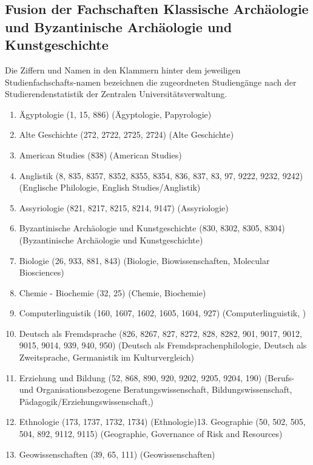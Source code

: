 \subsection{Fusion der Fachschaften Klassische Archäologie und Byzantinische Archäologie und Kunstgeschichte}
    \label{sec:appendix2}
    Die  Ziffern  und  Namen  in  den  Klammern  hinter  dem  jeweiligen  Studienfachschafts-namen bezeichnen die zugeordneten Studiengänge nach der Studierendenstatistik der Zentralen Universitätsverwaltung.
    \begin{enumerate}[noitemsep]
        \item Ägyptologie (1, 15, 886) (Ägyptologie, Papyrologie) 
        \item Alte Geschichte (272, 2722, 2725, 2724) (Alte Geschichte) 
        \item American Studies (838) (American Studies) 
        \item Anglistik (8, 835, 8357, 8352, 8355, 8354, 836, 837, 83, 97, 9222, 9232, 9242) (Englische Philologie, English Studies/Anglistik)
        \item Assyriologie (821, 8217, 8215, 8214, 9147) (Assyriologie) 
        \item Byzantinische Archäologie und Kunstgeschichte (830, 8302, 8305, 8304) (Byzantinische Archäologie und Kunstgeschichte) 
        \item Biologie (26, 933, 881, 843) (Biologie, Biowissenschaften, Molecular Biosciences) 
        \item Chemie - Biochemie (32, 25) (Chemie, Biochemie)
        \item Computerlinguistik (160, 1607, 1602, 1605, 1604, 927) (Computerlinguistik, ) 
        \item Deutsch als Fremdsprache (826, 8267, 827, 8272, 828, 8282, 901, 9017, 9012, 9015, 9014, 939, 940, 950) (Deutsch als Fremdsprachenphilologie, Deutsch als Zweitsprache, Germanistik im Kulturvergleich) 
        \item Erziehung und Bildung (52, 868, 890, 920, 9202, 9205, 9204, 190) (Berufs- und Organisationsbezogene Beratungswissenschaft, Bildungswissenschaft, Pädagogik/Erziehungswissenschaft,) 
        \item Ethnologie (173, 1737, 1732, 1734) (Ethnologie)13.  Geographie (50, 502, 505, 504, 892, 9112, 9115) (Geographie, Governance of Risk and Resources) 
        \item Geowissenschaften (39, 65, 111) (Geowissenschaften) 

\end{enumerate}
